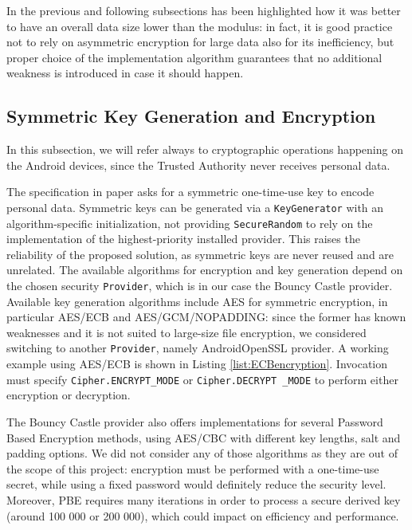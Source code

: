 In the previous and following subsections has been highlighted how it was better to have an overall data size lower than the modulus: in fact, it is good practice not to rely on asymmetric encryption for large data also for its inefficiency, but proper choice of the implementation algorithm guarantees that no additional weakness is introduced in case it should happen.

\subsection{Symmetric Key Generation and Encryption}
In this subsection, we will refer always to cryptographic operations happening on the Android devices, since the Trusted Authority never receives personal data.

The specification in paper \cite{pearson2011sticky} asks for a symmetric one-time-use key to encode personal data. Symmetric keys can be generated via a \texttt{KeyGenerator} with an algorithm-specific initialization, not providing \texttt{SecureRandom} to rely on the implementation of the highest-priority installed provider. This raises the reliability of the proposed solution, as symmetric keys are never reused and are unrelated. The available algorithms for encryption and key generation depend on the chosen security \texttt{Provider}, which is in our case the Bouncy Castle provider. Available key generation algorithms include AES for symmetric encryption, in particular AES/ECB and AES/GCM/NOPADDING: since the former has known weaknesses and it is not suited to large-size file encryption, we considered switching to another \texttt{Provider}, namely AndroidOpenSSL provider. A working example using AES/ECB is shown in Listing \ref{list:ECBencryption}. Invocation must specify \texttt{Cipher.ENCRYPT\_MODE} or \texttt{Cipher.DECRYPT \_MODE} to perform either encryption or decryption.



The Bouncy Castle provider also offers implementations for several Password Based Encryption methods, using AES/CBC with different key lengths, salt and padding options. We did not consider any of those algorithms as they are out of the scope of this project: encryption must be performed with a one-time-use secret, while using a fixed password would definitely reduce the security level. Moreover, PBE requires many iterations in order to process a secure derived key (around 100 000 or 200 000), which could impact on efficiency and performance.

